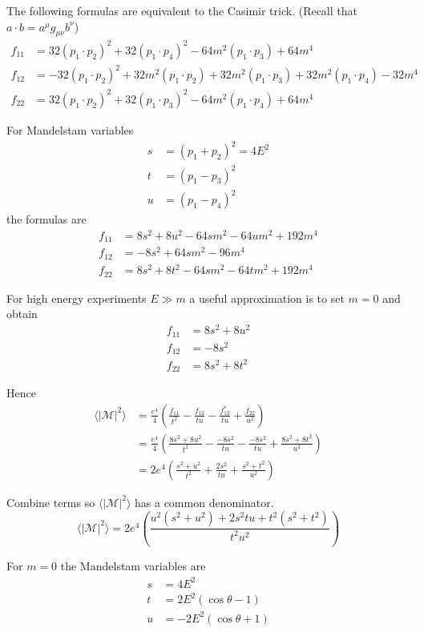 \documentclass[12pt]{article}
\begin{document}
The following formulas are equivalent to the Casimir trick.
(Recall that $a\cdot b=a^\mu g_{\mu\nu}b^\nu$)
\begin{align*}
f_{11}&=
32 (p_1\cdot p_2)^2 +
32 (p_1\cdot p_4)^2 -
64 m^2 (p_1\cdot p_3) + 64 m^4
\\
f_{12}&=
-32 (p_1\cdot p_2)^2 +
32 m^2 (p_1\cdot p_2) +
32 m^2 (p_1\cdot p_3) +
32 m^2 (p_1\cdot p_4) - 32m^4
\\
f_{22}&=
32 (p_1\cdot p_2)^2 +
32 (p_1\cdot p_3)^2 -
64 m^2 (p_1\cdot p_4) + 64 m^4
\end{align*}

For Mandelstam variables
\begin{align*}
s&=(p_1+p_2)^2=4E^2
\\
t&=(p_1-p_3)^2
\\
u&=(p_1-p_4)^2
\end{align*}
the formulas are
\begin{align*}
f_{11} &= 8 s^2 + 8 u^2 - 64 s m^2 - 64 u m^2 + 192 m^4
\\
f_{12} &= -8 s^2 + 64 s m^2 - 96 m^4
\\
f_{22} &= 8 s^2 + 8 t^2 - 64 s m^2 - 64 t m^2 + 192 m^4
\end{align*}

For high energy experiments $E\gg m$ a useful approximation is to set $m=0$ and obtain
\begin{align*}
f_{11}&=8s^2+8u^2\\
f_{12}&=-8s^2\\
f_{22}&=8s^2+8t^2
\end{align*}

Hence
\begin{align*}
\langle|\mathcal{M}|^2\rangle
&=\frac{e^4}{4}
\left(
\frac{f_{11}}{t^2}-\frac{f_{12}}{tu}-\frac{f_{12}^*}{tu}+\frac{f_{22}}{u^2}
\right)
\\
&=\frac{e^4}{4}
\left(
\frac{8s^2+8u^2}{t^2}-\frac{-8s^2}{tu}-\frac{-8s^2}{tu}+\frac{8s^2+8t^2}{u^2}
\right)
\\
&=2e^4
\left(
\frac{s^2+u^2}{t^2}+\frac{2s^2}{tu}+\frac{s^2+t^2}{u^2}
\right)
\end{align*}

Combine terms so $\langle|\mathcal{M}|^2\rangle$ has a common denominator.
\begin{equation*}
\langle|\mathcal{M}|^2\rangle
=2e^4
\left(
\frac{u^2(s^2+u^2)+2s^2tu+t^2(s^2+t^2)}{t^2u^2}
\right)
\end{equation*}

For $m=0$ the Mandelstam variables are
\begin{align*}
s&=4E^2
\\
t&=2E^2(\cos\theta-1)
\\
u&=-2E^2(\cos\theta+1)
\end{align*}
\end{document}
